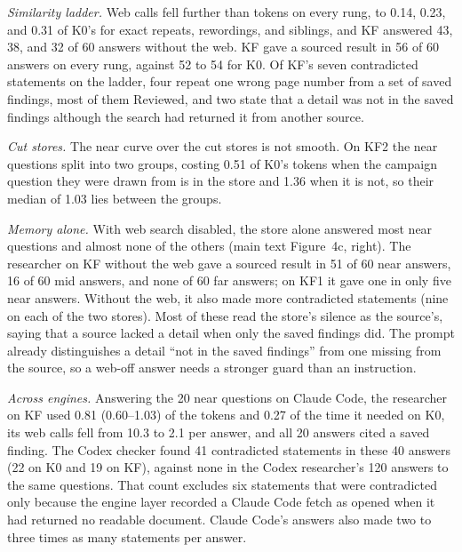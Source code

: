 \documentclass[journal=mamobx,manuscript=suppinfo]{achemso}
\begin{document}
\emph{Similarity ladder.}
Web calls fell further than tokens on every rung, to 0.14, 0.23, and 0.31 of K0's for exact repeats, rewordings, and siblings, and KF answered 43, 38, and 32 of 60 answers without the web.
KF gave a sourced result in 56 of 60 answers on every rung, against 52 to 54 for K0.
Of KF's seven contradicted statements on the ladder, four repeat one wrong page number from a set of saved findings, most of them Reviewed, and two state that a detail was not in the saved findings although the search had returned it from another source.

\emph{Cut stores.}
The near curve over the cut stores is not smooth.
On KF2 the near questions split into two groups, costing 0.51 of K0's tokens when the campaign question they were drawn from is in the store and 1.36 when it is not, so their median of 1.03 lies between the groups.

\emph{Memory alone.}
With web search disabled, the store alone answered most near questions and almost none of the others (main text Figure~4c, right).
The researcher on KF without the web gave a sourced result in 51 of 60 near answers, 16 of 60 mid answers, and none of 60 far answers; on KF1 it gave one in only five near answers.
Without the web, it also made more contradicted statements (nine on each of the two stores).
Most of these read the store's silence as the source's, saying that a source lacked a detail when only the saved findings did.
The prompt already distinguishes a detail ``not in the saved findings'' from one missing from the source, so a web-off answer needs a stronger guard than an instruction.

\emph{Across engines.}
Answering the 20 near questions on Claude Code, the researcher on KF used 0.81 (0.60--1.03) of the tokens and 0.27 of the time it needed on K0, its web calls fell from 10.3 to 2.1 per answer, and all 20 answers cited a saved finding.
The Codex checker found 41 contradicted statements in these 40 answers (22 on K0 and 19 on KF), against none in the Codex researcher's 120 answers to the same questions.
That count excludes six statements that were contradicted only because the engine layer recorded a Claude Code fetch as opened when it had returned no readable document.
Claude Code's answers also made two to three times as many statements per answer.
\end{document}
